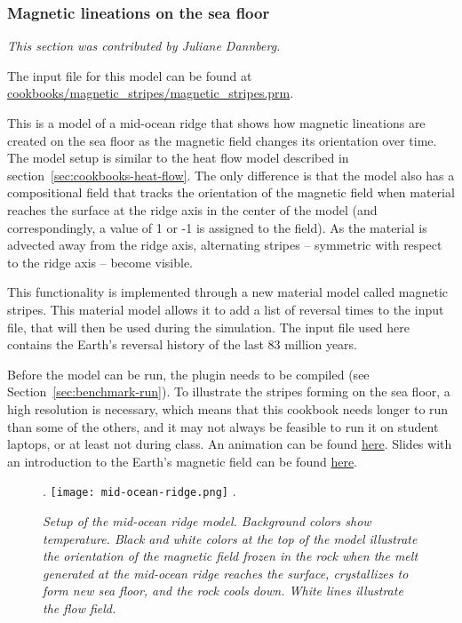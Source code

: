\subsubsection{Magnetic lineations on the sea floor}
\label{sec:cookbooks-magnetic-stripes}
\textit{This section was contributed by Juliane Dannberg.}

The input file for this model can be found at \url{cookbooks/magnetic_stripes/magnetic_stripes.prm}.

This is a model of a mid-ocean ridge that shows how magnetic lineations 
are created on the sea floor as the magnetic field changes its orientation over time.
The model setup is similar to the heat flow model described in section~\ref{sec:cookbooks-heat-flow}. 
The only difference is that the model also has a compositional field that tracks the orientation of the
magnetic field when material reaches the surface at the ridge axis in the center of the model 
(and correspondingly, a value of 1 or -1 is assigned to the field). As the material is advected 
away from the ridge axis, alternating stripes -- symmetric with respect to the ridge axis -- become visible. 

This functionality is implemented through a new material model called magnetic stripes. 
This material model allows it to add a list of reversal times to the input file, that will then be used during the 
simulation. The input file used here contains the Earth's reversal history of the last 83 million years. 

Before the model can be run, the plugin needs to be compiled (see Section~\ref{sec:benchmark-run}). 
To illustrate the stripes forming on the sea floor, a high resolution is necessary, which means that this
cookbook needs longer to run than some of the others, and it may not always be feasible to run it on student laptops, 
or at least not during class. An animation can be found \href{https://www.youtube.com/watch?v=KeHNhWLL7ws}{here}.
Slides with an introduction to the Earth's magnetic field can be found \href{https://www.dropbox.com/s/2kkw3ce2muvn4nh/08_geophysics_lecture_02_05.pdf?dl=0}{here}.

\begin{figure}[h]
\phantom.
\hfill
\texttt{[image: mid-ocean-ridge.png]}
\hfill
\phantom.
\caption{\it Setup of the mid-ocean ridge model. Background colors show temperature. Black and white colors at the top of the model illustrate the orientation of the magnetic field frozen in the rock when the melt generated at the mid-ocean ridge reaches the surface, crystallizes to form new sea floor, and the rock cools down. White lines illustrate the flow field.}
\label{fig:convection-box-iterations}
\end{figure}





